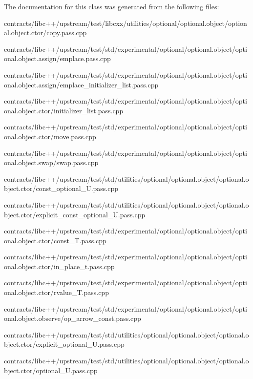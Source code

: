The documentation for this class was generated from the following files\+:\begin{DoxyCompactItemize}
\item 
contracts/libc++/upstream/test/libcxx/utilities/optional/optional.\+object/optional.\+object.\+ctor/copy.\+pass.\+cpp\item 
contracts/libc++/upstream/test/std/experimental/optional/optional.\+object/optional.\+object.\+assign/emplace.\+pass.\+cpp\item 
contracts/libc++/upstream/test/std/experimental/optional/optional.\+object/optional.\+object.\+assign/emplace\+\_\+initializer\+\_\+list.\+pass.\+cpp\item 
contracts/libc++/upstream/test/std/experimental/optional/optional.\+object/optional.\+object.\+ctor/initializer\+\_\+list.\+pass.\+cpp\item 
contracts/libc++/upstream/test/std/experimental/optional/optional.\+object/optional.\+object.\+ctor/move.\+pass.\+cpp\item 
contracts/libc++/upstream/test/std/experimental/optional/optional.\+object/optional.\+object.\+swap/swap.\+pass.\+cpp\item 
contracts/libc++/upstream/test/std/utilities/optional/optional.\+object/optional.\+object.\+ctor/const\+\_\+optional\+\_\+\+U.\+pass.\+cpp\item 
contracts/libc++/upstream/test/std/utilities/optional/optional.\+object/optional.\+object.\+ctor/explicit\+\_\+const\+\_\+optional\+\_\+\+U.\+pass.\+cpp\item 
contracts/libc++/upstream/test/std/experimental/optional/optional.\+object/optional.\+object.\+ctor/const\+\_\+\+T.\+pass.\+cpp\item 
contracts/libc++/upstream/test/std/experimental/optional/optional.\+object/optional.\+object.\+ctor/in\+\_\+place\+\_\+t.\+pass.\+cpp\item 
contracts/libc++/upstream/test/std/experimental/optional/optional.\+object/optional.\+object.\+ctor/rvalue\+\_\+\+T.\+pass.\+cpp\item 
contracts/libc++/upstream/test/std/experimental/optional/optional.\+object/optional.\+object.\+observe/op\+\_\+arrow\+\_\+const.\+pass.\+cpp\item 
contracts/libc++/upstream/test/std/utilities/optional/optional.\+object/optional.\+object.\+ctor/explicit\+\_\+optional\+\_\+\+U.\+pass.\+cpp\item 
contracts/libc++/upstream/test/std/utilities/optional/optional.\+object/optional.\+object.\+ctor/optional\+\_\+\+U.\+pass.\+cpp\end{DoxyCompactItemize}
